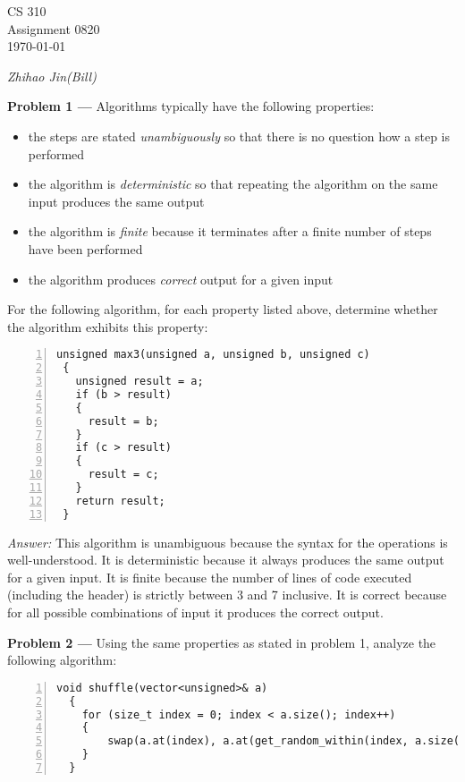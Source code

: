 \documentclass[11pt]{article}
\newcommand{\problem}[1]{\vspace*{2ex}\textbf{Problem #1 ---} }
\newcommand{\answer}{\textit{Answer: } }
\begin{document}
\thispagestyle{empty}

\begin{center}
{\large CS 310}\\
Assignment 0820\\
\today
\end{center}
\begin{flushright}
\emph{Zhihao Jin(Bill)}
\end{flushright}

\problem{1} Algorithms typically have the following properties:
\begin{itemize}
\item the steps are stated \emph{unambiguously} so that there is
  no question how a step is performed
\item the algorithm is \emph{deterministic} so that repeating the
  algorithm on the same input produces the same output
\item the algorithm is \emph{finite} because it terminates after a
  finite number of steps have been performed
\item the algorithm produces \emph{correct} output for a given input
\end{itemize}

For the following algorithm, for each property listed above, determine
whether the algorithm exhibits this property:

\begin{Verbatim}[numbers=left,xleftmargin=5mm]
 unsigned max3(unsigned a, unsigned b, unsigned c)
 {
   unsigned result = a;
   if (b > result)
   {
     result = b;
   }
   if (c > result)
   {
     result = c;
   }
   return result;
 }
\end{Verbatim}

\answer This algorithm is unambiguous because the syntax for the
operations is well-understood.  It is deterministic because it always
produces the same output for a given input.  It is finite because the
number of lines of code executed (including the header) is strictly
between 3 and 7 inclusive.  It is correct because for all possible
combinations of input it produces the correct output.

\problem{2} Using the same properties as stated in problem 1, analyze
the following algorithm:

\begin{Verbatim}[numbers=left,xleftmargin=5mm]
  void shuffle(vector<unsigned>& a)
  {
    for (size_t index = 0; index < a.size(); index++)
    {
        swap(a.at(index), a.at(get_random_within(index, a.size()));
    }
  }
\end{Verbatim}
\end{document}
